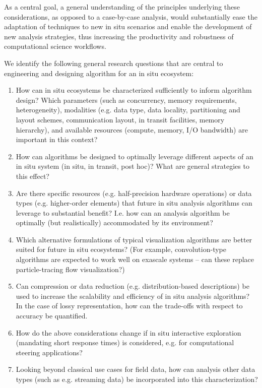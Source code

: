 \begin{refsection}
As a central goal, a general understanding of the principles underlying these considerations, as opposed to a case-by-case analysis, would substantially ease the adaptation of techniques to new in situ scenarios and enable the development of new analysis strategies, thus increasing the productivity and robustness of computational science workflows.

We identify the following general research questions that are central to engineering and designing algorithm for an in situ ecosystem:
\begin{enumerate}
\item How can in situ ecosystems be characterized sufficiently to inform algorithm design? Which parameters (such as concurrency, memory requirements, heterogeneity), modalities (e.g. data type, data locality, partitioning and layout schemes, communication layout, in transit facilities, memory hierarchy), and available resources (compute, memory, I/O bandwidth) are important in this context?
\item How can algorithms be designed to optimally leverage different aspects of an in situ system (in situ, in transit, post hoc)? What are general strategies to this effect?
\item Are there specific resources (e.g. half-precision hardware operations) or data types (e.g. higher-order elements) that future in situ analysis algorithms can leverage to substantial benefit? I.e. how can an analysis algorithm be optimally (but realistically) accommodated by its environment?
\item Which alternative formulations of typical visualization algorithms are better suited for future in situ ecosystems? (For example, convolution-type algorithms are expected to work well on exascale systems – can these replace particle-tracing flow visualization?)
\item Can compression or data reduction (e.g. distribution-based descriptions) be used to increase the scalability and efficiency of in situ analysis algorithms? In the case of lossy representation, how can the trade-offs with respect to accuracy be quantified.
\item How do the above considerations change if in situ interactive exploration (mandating short response times)  is considered, e.g. for computational steering applications?
\item Looking beyond classical use cases for field data, how can analysis other data types (such as e.g. streaming data) be incorporated into this characterization?
\end{enumerate}


\end{refsection}
